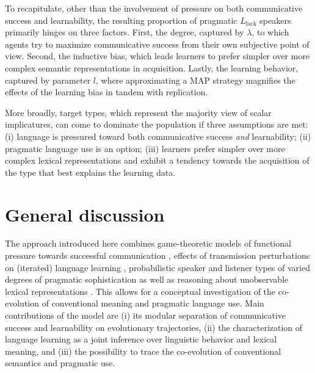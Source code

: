 \documentclass[a4paper, 11pt]{article}
\theoremstyle{Satz}
\newcommand{\mylang}[1]{\ensuremath{L_{\text{#1}}}\xspace} %
\newcommand{\Llack}{\mylang{lack}}
\begin{document}
To recapitulate, other than the involvement of pressure on both communicative success and learnability,
the resulting proportion of pragmatic $\Llack$ speakers primarily hinges on three
factors. First, the degree, captured by $\lambda$, to which agents try to maximize
communicative success from their own subjective point of view. Second, the inductive bias,
which leads learners to prefer simpler over more complex semantic representations in
acquisition. Lastly, the learning behavior, captured by parameter $l$, where approximating a
MAP strategy magnifies the effects of the learning bias in tandem with replication. 


More broadly, target types, which represent the majority view of scalar implicatures, can come to
dominate the population if three assumptions are met: (i) language is pressured toward both
communicative success {\em and} learnability; (ii) pragmatic language use is an option; (iii) learners prefer
simpler over more complex lexical representations and exhibit a tendency towards the
acquisition of the type that best explains the learning data.


\section{General discussion}\label{sec:discussion}
The approach introduced here combines game-theoretic models of functional pressure towards
successful communication \citep{nowak+krakauer:1999}, effects of transmission perturbations on
(iterated) language learning \citep{griffiths+kalish:2007}, probabilistic speaker and listener
types of varied degrees of pragmatic sophistication \citep{frank+goodman:2012,
  franke+jaeger:2014} as well as reasoning about unobservable lexical representations
\citep{bergen+etal:2012,bergen+etal:2016}. This allows for a conceptual investigation of the
co-evolution of conventional meaning and pragmatic language use. Main contributions of the
model are (i) its modular separation of communicative success and learnability on evolutionary
trajectories, (ii) the characterization of language learning as a joint inference over
linguistic behavior and lexical meaning, and (iii) the possibility to trace the co-evolution of
conventional semantics and pragmatic use.
\end{document}
